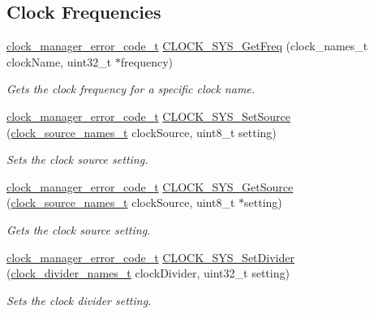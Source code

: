 \subsection*{Clock Frequencies}
\begin{DoxyCompactItemize}
\item 
\hyperlink{group__clock__manager_ga384b25940eac5c28dceb4e11131818da}{clock\+\_\+manager\+\_\+error\+\_\+code\+\_\+t} \hyperlink{group__clock__manager_gaaf2bcbff6bbb1ae3fa927d6636930952}{C\+L\+O\+C\+K\+\_\+\+S\+Y\+S\+\_\+\+Get\+Freq} (clock\+\_\+names\+\_\+t clock\+Name, uint32\+\_\+t $\ast$frequency)
\begin{DoxyCompactList}\small\item\em Gets the clock frequency for a specific clock name. \end{DoxyCompactList}\item 
\hyperlink{group__clock__manager_ga384b25940eac5c28dceb4e11131818da}{clock\+\_\+manager\+\_\+error\+\_\+code\+\_\+t} \hyperlink{group__clock__manager_ga5c4ffc75afc5217797a539ea944fe44e}{C\+L\+O\+C\+K\+\_\+\+S\+Y\+S\+\_\+\+Set\+Source} (\hyperlink{group__sim__hal_ga9c9127c1f219ab5bfb55d7041124a8bf}{clock\+\_\+source\+\_\+names\+\_\+t} clock\+Source, uint8\+\_\+t setting)
\begin{DoxyCompactList}\small\item\em Sets the clock source setting. \end{DoxyCompactList}\item 
\hyperlink{group__clock__manager_ga384b25940eac5c28dceb4e11131818da}{clock\+\_\+manager\+\_\+error\+\_\+code\+\_\+t} \hyperlink{group__clock__manager_ga0dbd45226d934c3f647275ae08624e49}{C\+L\+O\+C\+K\+\_\+\+S\+Y\+S\+\_\+\+Get\+Source} (\hyperlink{group__sim__hal_ga9c9127c1f219ab5bfb55d7041124a8bf}{clock\+\_\+source\+\_\+names\+\_\+t} clock\+Source, uint8\+\_\+t $\ast$setting)
\begin{DoxyCompactList}\small\item\em Gets the clock source setting. \end{DoxyCompactList}\item 
\hyperlink{group__clock__manager_ga384b25940eac5c28dceb4e11131818da}{clock\+\_\+manager\+\_\+error\+\_\+code\+\_\+t} \hyperlink{group__clock__manager_ga588310517b8e2b50fdb2569bdba4116b}{C\+L\+O\+C\+K\+\_\+\+S\+Y\+S\+\_\+\+Set\+Divider} (\hyperlink{group__sim__hal_ga51a225b8eb0e0d00e7911b3603d7caa2}{clock\+\_\+divider\+\_\+names\+\_\+t} clock\+Divider, uint32\+\_\+t setting)
\begin{DoxyCompactList}\small\item\em Sets the clock divider setting. \end{DoxyCompactList}\item 

\end{DoxyCompactItemize}
